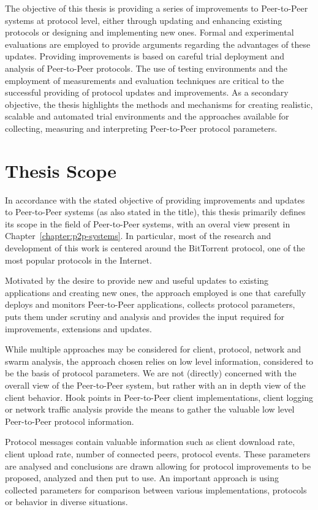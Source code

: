 The objective of this thesis is providing a series of improvements to
Peer-to-Peer systems at protocol level, either through updating and enhancing
existing protocols or designing and implementing new ones. Formal and
experimental evaluations are employed to provide arguments regarding the
advantages of these updates. Providing improvements is based on careful
trial deployment and analysis of Peer-to-Peer protocols. The use of testing
environments and the employment of measurements and evaluation techniques are
critical to the successful providing of protocol updates and improvements. As
a secondary objective, the thesis highlights the methods and mechanisms for
creating realistic, scalable and automated trial environments and the
approaches available for collecting, measuring and interpreting Peer-to-Peer
protocol parameters.

\section{Thesis Scope}
\label{sec:intro:scope}

In accordance with the stated objective of providing improvements and updates
to Peer-to-Peer systems (as also stated in the title), this thesis primarily
defines its scope in the field of Peer-to-Peer systems, with an overal view
present in Chapter~\ref{chapter:p2p-systems}. In particular, most of
the research and development of this work is centered around the BitTorrent
protocol, one of the most popular protocols in the Internet.

Motivated by the desire to provide new and useful updates to existing
applications and creating new ones, the approach employed is one that
carefully deploys and monitors Peer-to-Peer applications, collects protocol
parameters, puts them under scrutiny and analysis and provides the input
required for improvements, extensions and updates.

While multiple approaches may be considered for client, protocol, network and
swarm analysis, the approach chosen relies on low level information,
considered to be the basis of protocol parameters. We are not (directly)
concerned with the overall view of the Peer-to-Peer system, but rather with an
in depth view of the client behavior. Hook points in Peer-to-Peer client
implementations, client logging or network traffic analysis provide the means
to gather the valuable low level Peer-to-Peer protocol information.

Protocol messages contain valuable information such as client download rate,
client upload rate, number of connected peers, protocol events. These
parameters are analysed and conclusions are drawn allowing for protocol
improvements to be proposed, analyzed and then put to use. An important
approach is using collected parameters for comparison between various
implementations, protocols or behavior in diverse situations.

